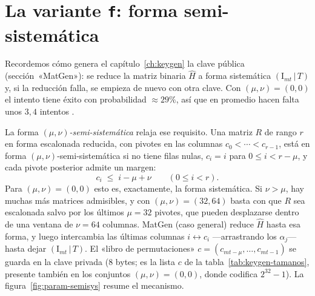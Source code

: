 \section{La variante \texttt{f}: forma semi-sistemática}\label{sec:param-f}

Recordemos cómo genera el capítulo~\ref{ch:keygen} la clave pública
(sección~«MatGen»): se reduce la matriz binaria $\hat H$ a forma
sistemática $(\mathrm{I}_{mt}\,|\,T)$ y, si la reducción falla, se
empieza de nuevo con otra clave. Con $(\mu,\nu)=(0,0)$ el intento
tiene éxito con probabilidad $\approx29\%$, así que en promedio hacen
falta unos $3{,}4$ intentos \cite{cmrationale}.

La forma \emph{$(\mu,\nu)$-semi-sistemática} relaja ese requisito. Una
matriz $R$ de rango $r$ en forma escalonada reducida, con pivotes en
las columnas $c_0<\cdots<c_{r-1}$, está en forma
$(\mu,\nu)$-semi-sistemática si no tiene filas nulas, $c_i=i$ para
$0\le i<r-\mu$, y cada pivote posterior admite un margen:
\[
  c_i\;\le\;i-\mu+\nu \qquad (0\le i<r).
\]
Para $(\mu,\nu)=(0,0)$ esto es, exactamente, la forma sistemática. Si
$\nu>\mu$, hay muchas más matrices admisibles, y con
$(\mu,\nu)=(32,64)$ basta con que $R$ sea escalonada salvo por los
últimos $\mu=32$ pivotes, que pueden desplazarse dentro de una ventana
de $\nu=64$ columnas. MatGen (caso general) reduce $\hat H$ hasta esa
forma, y luego intercambia las últimas columnas $i\leftrightarrow c_i$
---arrastrando los $\alpha_j$--- hasta dejar $(\mathrm{I}_{mt}\,|\,T)$.
El «libro de permutaciones» $c=(c_{mt-\mu},\dots,c_{mt-1})$ se guarda
en la clave privada (8 bytes; es la lista $c$ de la
tabla~\ref{tab:keygen-tamanos}, presente también en los conjuntos
$(\mu,\nu)=(0,0)$, donde codifica $2^{32}-1$).
La figura~\ref{fig:param-semisys} resume el mecanismo.

